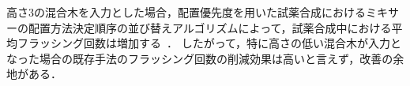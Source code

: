 



高さ3の混合木を入力とした場合，配置優先度を用いた試薬合成におけるミキサーの配置方法決定順序の並び替えアルゴリズムによって，試薬合成中における平均フラッシング回数は増加する~\cite{10089903}．
したがって，特に高さの低い混合木が入力となった場合の既存手法のフラッシング回数の削減効果は高いと言えず，改善の余地がある．

